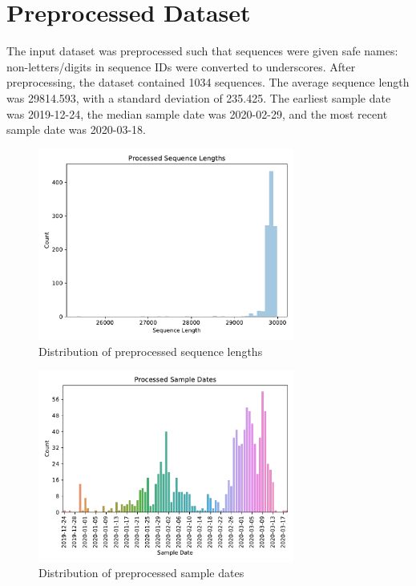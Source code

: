 \documentclass{article}
\begin{document}
\section{Preprocessed Dataset}
The input dataset was preprocessed such that sequences were given safe names: non-letters/digits in sequence IDs were converted to underscores. After preprocessing, the dataset contained 1034 sequences. The average sequence length was 29814.593, with a standard deviation of 235.425. The earliest sample date was 2019-12-24, the median sample date was 2020-02-29, and the most recent sample date was 2020-03-18.

\begin{figure}[h]
\centering
\includegraphics[width=0.75\textwidth,keepaspectratio]{./figs/processed_sequence_lengths.pdf}
\caption{Distribution of preprocessed sequence lengths}
\end{figure}



\begin{figure}[h]
\centering
\includegraphics[width=0.75\textwidth,keepaspectratio]{./figs/processed_sample_dates.pdf}
\caption{Distribution of preprocessed sample dates}
\end{figure}
\end{document}
